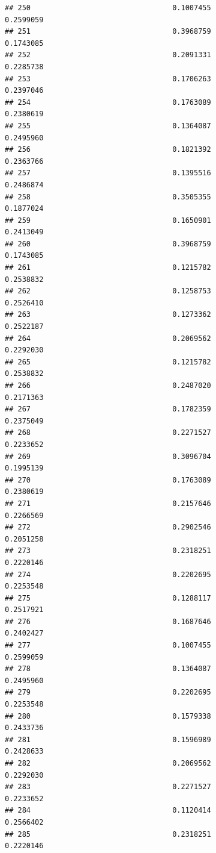 \documentclass[
  american,
  man,floatsintext]{apa7}
\begin{document}
\begin{verbatim}
## 250                                 0.1007455               0.2599059
## 251                                 0.3968759               0.1743085
## 252                                 0.2091331               0.2285738
## 253                                 0.1706263               0.2397046
## 254                                 0.1763089               0.2380619
## 255                                 0.1364087               0.2495960
## 256                                 0.1821392               0.2363766
## 257                                 0.1395516               0.2486874
## 258                                 0.3505355               0.1877024
## 259                                 0.1650901               0.2413049
## 260                                 0.3968759               0.1743085
## 261                                 0.1215782               0.2538832
## 262                                 0.1258753               0.2526410
## 263                                 0.1273362               0.2522187
## 264                                 0.2069562               0.2292030
## 265                                 0.1215782               0.2538832
## 266                                 0.2487020               0.2171363
## 267                                 0.1782359               0.2375049
## 268                                 0.2271527               0.2233652
## 269                                 0.3096704               0.1995139
## 270                                 0.1763089               0.2380619
## 271                                 0.2157646               0.2266569
## 272                                 0.2902546               0.2051258
## 273                                 0.2318251               0.2220146
## 274                                 0.2202695               0.2253548
## 275                                 0.1288117               0.2517921
## 276                                 0.1687646               0.2402427
## 277                                 0.1007455               0.2599059
## 278                                 0.1364087               0.2495960
## 279                                 0.2202695               0.2253548
## 280                                 0.1579338               0.2433736
## 281                                 0.1596989               0.2428633
## 282                                 0.2069562               0.2292030
## 283                                 0.2271527               0.2233652
## 284                                 0.1120414               0.2566402
## 285                                 0.2318251               0.2220146

\end{verbatim}
\end{document}
